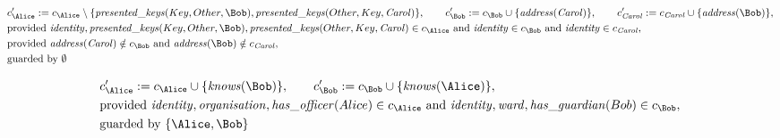 \begin{align*}
&
c'_
{
\Alice
}
 := 
c_
{
\Alice
}
 \setminus 
\{
\mathit{\detokenize{
presented_keys
}}
(
Key
,
Other
,
\Bob
)
,
\mathit{\detokenize{
presented_keys
}}
(
Other
,
Key
,
\mathit{Carol}
)
\}
, \qquad 
c'_
{
\Bob
}
 := 
c_
{
\Bob
}
 \cup 
\{
\mathit{\detokenize{
address
}}
(
\mathit{Carol}
)
\}
, \qquad 
c'_
{
\mathit{Carol}
}
 := 
c_
{
\mathit{Carol}
}
 \cup 
\{
\mathit{\detokenize{
address
}}
(
\Bob
)
\}
,\\
&
\text{provided } 
\mathit{\detokenize{
identity
}}
,
\mathit{\detokenize{
presented_keys
}}
(
Key
,
Other
,
\Bob
)
,
\mathit{\detokenize{
presented_keys
}}
(
Other
,
Key
,
\mathit{Carol}
)
 \in c_
{
\Alice
}
 \text{ and } 
\mathit{\detokenize{
identity
}}
 \in c_
{
\Bob
}
 \text{ and } 
\mathit{\detokenize{
identity
}}
 \in c_
{
\mathit{Carol}
}
,\\
&
\text{provided } 
\mathit{\detokenize{
address
}}
(
\mathit{Carol}
)
 \notin c_
{
\Bob
}
 \text{ and } 
\mathit{\detokenize{
address
}}
(
\Bob
)
 \notin c_
{
\mathit{Carol}
}
,\\
&
\text{guarded by } \emptyset
\end{align*}

\begin{align*}
&
c'_
{
\Alice
}
 := 
c_
{
\Alice
}
 \cup 
\{
\mathit{\detokenize{
knows
}}
(
\Bob
)
\}
, \qquad 
c'_
{
\Bob
}
 := 
c_
{
\Bob
}
 \cup 
\{
\mathit{\detokenize{
knows
}}
(
\Alice
)
\}
,\\
&
\text{provided } 
\mathit{\detokenize{
identity
}}
,
\mathit{\detokenize{
organisation
}}
,
\mathit{\detokenize{
has_officer
}}
(
Alice
)
 \in c_
{
\Alice
}
 \text{ and } 
\mathit{\detokenize{
identity
}}
,
\mathit{\detokenize{
ward
}}
,
\mathit{\detokenize{
has_guardian
}}
(
Bob
)
 \in c_
{
\Bob
}
,\\
&
\text{guarded by } \{
\Alice
,
\Bob
\}
\end{align*}

